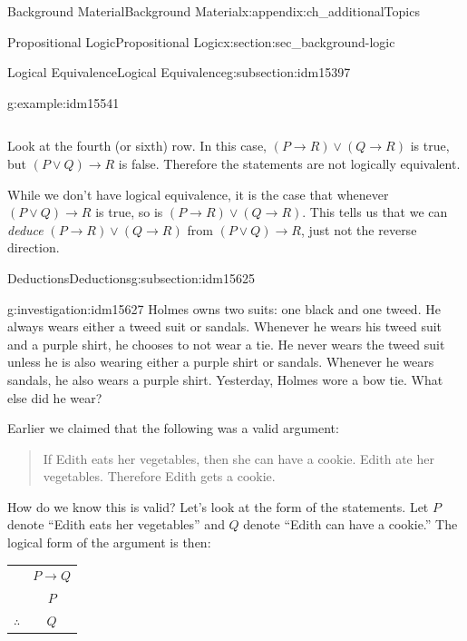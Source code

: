 \documentclass[oneside,10pt,]{book}
\numberwithin{equation}{chapter}
\newcommand{\hrulethin}  {\noalign{\hrule height 0.04em}}
\def\imp{\rightarrow}
\begin{document}
\begin{appendixptx}{Background Material}{}{Background Material}{}{}{x:appendix:ch_additionalTopics}
\begin{sectionptx}{Propositional Logic}{}{Propositional Logic}{}{}{x:section:sec_background-logic}
\begin{subsectionptx}{Logical Equivalence}{}{Logical Equivalence}{}{}{g:subsection:idm15397}
\begin{example}{}{g:example:idm15541}
\begin{sidebyside}{1}{0}{0}{0}
\begin{sbspanel}{1}
{\begin{tabular}{cAcAcBcAc}
\end{tabular}
\par}
\end{sbspanel}%
\end{sidebyside}%
\par
Look at the fourth (or sixth) row. In this case, \((P \imp R) \vee (Q \imp R)\) is true, but \((P \vee Q) \imp R\) is false. Therefore the statements are not logically equivalent.%
\par
While we don't have logical equivalence, it is the case that whenever \((P \vee Q) \imp R\) is true, so is \((P \imp R) \vee (Q \imp R)\).  This tells us that we can \emph{deduce} \((P \imp R) \vee (Q \imp R)\) from \((P \vee Q) \imp R\), just not the reverse direction.%
\end{example}
\end{subsectionptx}
%
%
\typeout{************************************************}
\typeout{************************************************}
%
\begin{subsectionptx}{Deductions}{}{Deductions}{}{}{g:subsection:idm15625}
\begin{investigation}{}{g:investigation:idm15627}%
Holmes owns two suits: one black and one tweed. He always wears either a tweed suit or sandals. Whenever he wears his tweed suit and a purple shirt, he chooses to not wear a tie. He never wears the tweed suit unless he is also wearing either a purple shirt or sandals. Whenever he wears sandals, he also wears a purple shirt. Yesterday, Holmes wore a bow tie. What else did he wear?%
\end{investigation}
Earlier we claimed that the following was a valid argument:%
\begin{quote}%
If Edith eats her vegetables, then she can have a cookie. Edith ate her vegetables. Therefore Edith gets a cookie.%
\end{quote}
How do we know this is valid? Let's look at the form of the statements. Let \(P\) denote ``Edith eats her vegetables'' and \(Q\) denote ``Edith can have a cookie.'' The logical form of the argument is then:%
\begin{sidebyside}{1}{0}{0}{0}%
\begin{sbspanel}{1}%
{\centering%
\begin{tabular}{cc}
&\(P \imp Q\)\tabularnewline[0pt]
&\(P\)\tabularnewline\hrulethin
\(\therefore\)&\(Q\)
\end{tabular}
\par}
\end{sbspanel}%

\end{sidebyside}
\end{subsectionptx}
\end{sectionptx}
\end{appendixptx}
\end{document}
